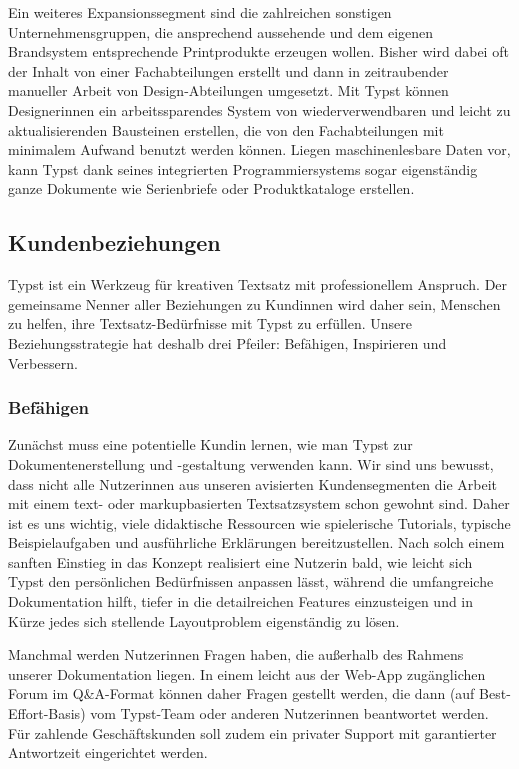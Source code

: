 \documentclass[11pt, a4paper]{article}
\newcommand{\gender}{\raisebox{-.25em}{*}}
\begin{document}
Ein weiteres Expansionssegment sind die zahlreichen sonstigen Unternehmensgruppen, die ansprechend aussehende und dem eigenen Brandsystem entsprechende Printprodukte erzeugen wollen. Bisher wird dabei oft der Inhalt von einer Fachabteilungen erstellt und dann in zeitraubender manueller Arbeit von Design-Abteilungen umgesetzt. Mit Typst können Designer\gender{}innen ein arbeitssparendes System von wiederverwendbaren und leicht zu aktualisierenden Bausteinen erstellen, die von den Fachabteilungen mit minimalem Aufwand benutzt werden können. Liegen maschinenlesbare Daten vor, kann Typst dank seines integrierten Programmiersystems sogar eigenständig ganze Dokumente wie Serienbriefe oder Produktkataloge erstellen.

\newpage
\subsection*{Kundenbeziehungen}

Typst ist ein Werkzeug für kreativen Textsatz mit professionellem Anspruch. Der gemeinsame Nenner aller Beziehungen zu Kund\gender{}innen wird daher sein, Menschen zu helfen, ihre Textsatz-Bedürfnisse mit Typst zu erfüllen. Unsere Beziehungsstrategie hat deshalb drei Pfeiler: Befähigen, Inspirieren und Verbessern.

\subsubsection*{Befähigen}

Zunächst muss ein\gender{}e potentielle\gender{} Kund\gender{}in lernen, wie man Typst zur Dokumentenerstellung und -gestaltung verwenden kann. Wir sind uns bewusst, dass nicht alle Nutzer\gender{}innen aus unseren avisierten Kundensegmenten die Arbeit mit einem text- oder markupbasierten Textsatzsystem schon gewohnt sind. Daher ist es uns wichtig, viele didaktische Ressourcen wie spielerische Tutorials, typische Beispielaufgaben und ausführliche Erklärungen bereitzustellen. Nach solch einem sanften Einstieg in das Konzept realisiert ein\gender{}e Nutzer\gender{}in bald, wie leicht sich Typst den persönlichen Bedürfnissen anpassen lässt, während die umfangreiche Dokumentation hilft, tiefer in die detailreichen Features einzusteigen und in Kürze jedes sich stellende Layoutproblem eigenständig zu lösen.

Manchmal werden Nutzer\gender{}innen Fragen haben, die außerhalb des Rahmens unserer Dokumentation liegen. In einem leicht aus der Web-App zugänglichen Forum im Q\&A-Format können daher Fragen gestellt werden, die dann (auf Best-Effort-Basis) vom Typst-Team oder anderen Nutzer\gender{}innen beantwortet werden. Für zahlende Geschäftskunden soll zudem ein privater Support mit garantierter Antwortzeit eingerichtet werden.
\end{document}
